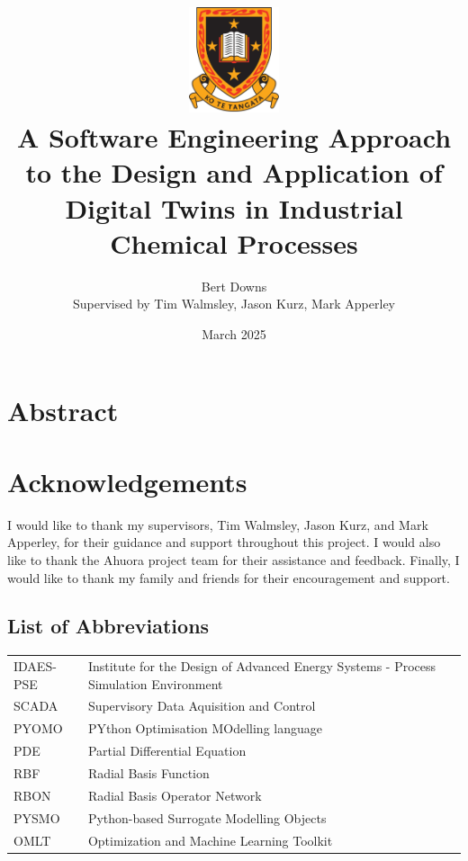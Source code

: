 \documentclass[12pt]{report}
\title{ \includegraphics[width=0.2\textwidth]{uow_logo.png} \\
A Software Engineering Approach to the Design and
Application of Digital Twins in Industrial Chemical
Processes \\
}
\author{Bert Downs  \\ 
Supervised by Tim Walmsley, Jason Kurz, Mark Apperley }
\date{March 2025}
\begin{document}


\maketitle


\chapter*{Abstract}




\chapter*{Acknowledgements}

I would like to thank my supervisors, Tim Walmsley, Jason Kurz, and Mark Apperley, for their guidance and support throughout this project. I would also like to thank the Ahuora project team for their assistance and feedback. Finally, I would like to thank my family and friends for their encouragement and support.

\tableofcontents
\listoffigures
\listoftables

\section*{List of Abbreviations}

\begin{tabular}{lL{13cm}}
    IDAES-PSE & Institute for the Design of Advanced Energy Systems - Process Simulation Environment \\
    SCADA & Supervisory Data Aquisition and Control \\
    PYOMO & PYthon Optimisation MOdelling language \\
    PDE & Partial Differential Equation \\
    RBF & Radial Basis Function \\
    RBON & Radial Basis Operator Network \\
    PYSMO & Python-based Surrogate Modelling Objects \\
    OMLT & Optimization and Machine Learning Toolkit \\
\end{tabular}

\newpage
{}











\begin{appendices}

\end{appendices}
\end{document}
